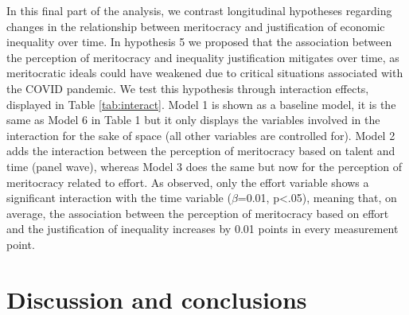 \documentclass[
  12pt,
  a4paper,
]{article}
\begin{document}
In this final part of the analysis, we contrast longitudinal hypotheses regarding changes in the relationship between meritocracy and justification of economic inequality over time. In hypothesis 5 we proposed that the association between the perception of meritocracy and inequality justification mitigates over time, as meritocratic ideals could have weakened due to critical situations associated with the COVID pandemic. We test this hypothesis through interaction effects, displayed in Table \ref{tab:interact}. Model 1 is shown as a baseline model, it is the same as Model 6 in Table 1 but it only displays the variables involved in the interaction for the sake of space (all other variables are controlled for). Model 2 adds the interaction between the perception of meritocracy based on talent and time (panel wave), whereas Model 3 does the same but now for the perception of meritocracy related to effort. As observed, only the effort variable shows a significant interaction with the time variable (\(\beta\)=0.01, p\textless.05), meaning that, on average, the association between the perception of meritocracy based on effort and the justification of inequality increases by 0.01 points in every measurement point.

\section{Discussion and conclusions}\label{discussion-and-conclusions}
\end{document}
